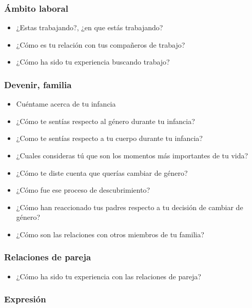 \subsubsection{Ámbito laboral}

\begin{itemize}
\item
  ¿Estas trabajando?, ¿en que estás trabajando?
\item
  ¿Cómo es tu relación con tus compañeros de trabajo?
\item
  ¿Cómo ha sido tu experiencia buscando trabajo?
\end{itemize}

\subsubsection{Devenir, familia}

\begin{itemize}
\item
  Cuéntame acerca de tu infancia
\item
  ¿Cómo te sentías respecto al género durante tu infancia?
\item
  ¿Como te sentías respecto a tu cuerpo durante tu infancia?
\item
  ¿Cuales consideras tú que son los momentos más importantes de tu vida?
\item
  ¿Cómo te diste cuenta que querías cambiar de género?
\item
  ¿Cómo fue ese proceso de descubrimiento?
\item
  ¿Cómo han reaccionado tus padres respecto a tu decisión de cambiar de
  género?
\item
  ¿Cómo son las relaciones con otros miembros de tu familia?
\end{itemize}

\subsubsection{Relaciones de pareja}

\begin{itemize}
\item
  ¿Cómo ha sido tu experiencia con las relaciones de pareja?
\end{itemize}

\subsubsection{Expresión}

